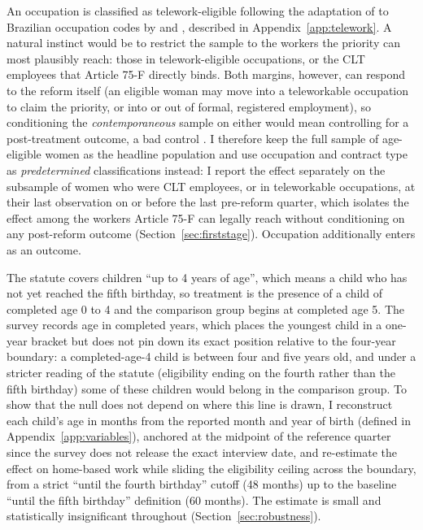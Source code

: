 \documentclass[12pt]{article}
\begin{document}
An occupation is classified as telework-eligible following the adaptation of \citet{dingelneiman2020} to Brazilian occupation codes by \citet{goes2020} and \citet{costa2024}, described in Appendix~\ref{app:telework}. A natural instinct would be to restrict the sample to the workers the priority can most plausibly reach: those in telework-eligible occupations, or the CLT employees that Article 75-F directly binds. Both margins, however, can respond to the reform itself (an eligible woman may move into a teleworkable occupation to claim the priority, or into or out of formal, registered employment), so conditioning the \emph{contemporaneous} sample on either would mean controlling for a post-treatment outcome, a bad control \citep{angristpischke2009}. I therefore keep the full sample of age-eligible women as the headline population and use occupation and contract type as \emph{predetermined} classifications instead: I report the effect separately on the subsample of women who were CLT employees, or in teleworkable occupations, at their last observation on or before the last pre-reform quarter, which isolates the effect among the workers Article 75-F can legally reach without conditioning on any post-reform outcome (Section~\ref{sec:firststage}). Occupation additionally enters as an outcome.

The statute covers children ``up to 4 years of age'', which means a child who has not yet reached the fifth birthday, so treatment is the presence of a child of completed age 0 to 4 and the comparison group begins at completed age 5. The survey records age in completed years, which places the youngest child in a one-year bracket but does not pin down its exact position relative to the four-year boundary: a completed-age-4 child is between four and five years old, and under a stricter reading of the statute (eligibility ending on the fourth rather than the fifth birthday) some of these children would belong in the comparison group. To show that the null does not depend on where this line is drawn, I reconstruct each child's age in months from the reported month and year of birth (defined in Appendix~\ref{app:variables}), anchored at the midpoint of the reference quarter since the survey does not release the exact interview date, and re-estimate the effect on home-based work while sliding the eligibility ceiling across the boundary, from a strict ``until the fourth birthday'' cutoff (48 months) up to the baseline ``until the fifth birthday'' definition (60 months). The estimate is small and statistically insignificant throughout (Section~\ref{sec:robustness}).
\end{document}
